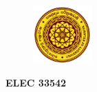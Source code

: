 \documentclass[11pt]{report}	%
\begin{document}








\begin{titlepage}	%


\centering 	%

\vspace*{\fill} 	%

\begin{figure}[h] %

\centering  %

\includegraphics[width=0.2\textwidth]{KLN logo} %


\end{figure}

\large\textbf{ELEC 33542}\\ 	%

\vspace{0.5cm} %


\end{titlepage}
\end{document}
